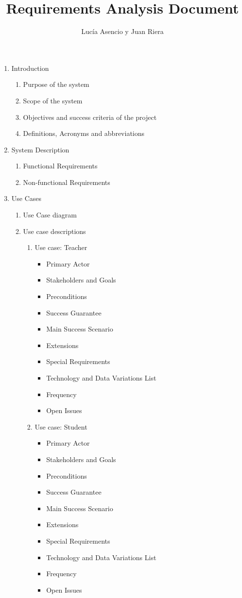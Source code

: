 \documentclass{article}
\title{Requirements Analysis Document}
\author{Lucía Asencio y Juan Riera}
\begin{document}
\maketitle
\begin{enumerate}
	\item{Introduction}
	\begin{enumerate}
		\item{Purpose of the system}
		\item{Scope of the system}
		\item{Objectives and success criteria of the project}
		\item{Definitions, Acronyms and abbreviations}
	\end{enumerate}
	
	\item{System Description}
	\begin{enumerate}
		\item{Functional Requirements}
		\item{Non-functional Requirements}
	\end{enumerate}
	\item{Use Cases}
	\begin{enumerate}
		\item{Use Case diagram}
		\item{Use case descriptions}
		\begin{enumerate}
			\item{Use case: Teacher}
			\begin{itemize}
				\item Primary Actor
				\item Stakeholders and Goals
				\item Preconditions
				\item Success Guarantee
				\item Main Success Scenario
				\item Extensions
				\item Special Requirements
				\item Technology and Data Variations List
				\item Frequency
				\item Open Issues
			\end{itemize}
			\item{Use case: Student}
			
			
			
			\begin{itemize}
				\item Primary Actor
				\item Stakeholders and Goals
				\item Preconditions
				\item Success Guarantee
				\item Main Success Scenario
				\item Extensions
				\item Special Requirements
				\item Technology and Data Variations List
				\item Frequency
				\item Open Issues
				

\end{itemize}
\end{enumerate}
\end{enumerate}
\end{enumerate}
\end{document}
